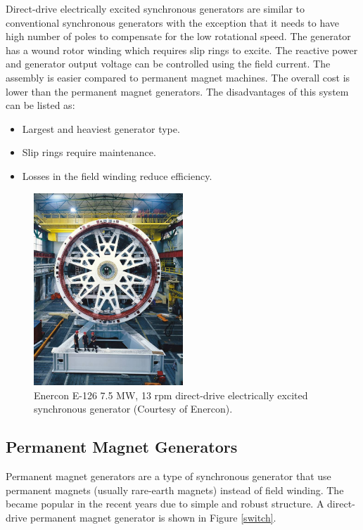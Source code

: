 \documentclass[a4paper, 11pt]{article} %
\begin{document}
Direct-drive electrically excited synchronous generators are similar to conventional synchronous generators with the exception that it needs to have high number of poles to compensate for the low rotational speed. The generator has a wound rotor winding which requires slip rings to excite. The reactive power and generator output voltage can be controlled using the field current. The assembly is easier compared to permanent magnet machines. The overall cost is lower than the permanent magnet generators. The disadvantages of this system can be listed as:

\begin{itemize}
	\item Largest and heaviest generator type.
	\item Slip rings require maintenance.
	\item Losses in the field winding reduce efficiency.
\end{itemize}


  \begin{figure}
    \centering
    \includegraphics[width=0.5\textwidth]{enercon}
    \caption{Enercon E-126 7.5 MW, 13 rpm direct-drive electrically excited synchronous generator (Courtesy of Enercon).} 
    \label{enercon}
  \end{figure}


\subsection{Permanent Magnet Generators}

Permanent magnet generators are a type of synchronous generator that use permanent magnets (usually rare-earth magnets) instead of field winding. The became popular in the recent years due to simple and robust structure. A direct-drive permanent magnet generator is shown in Figure \ref{switch}.
\end{document}
